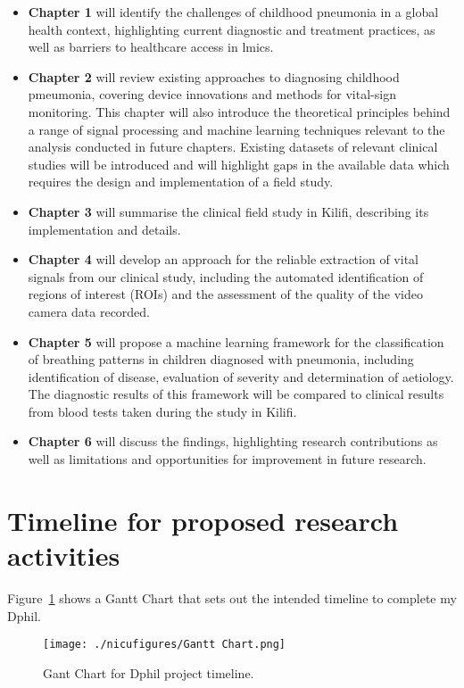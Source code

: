\begin{itemize}

\item\textbf{ Chapter 1} will identify the challenges of childhood pneumonia in a global health context, highlighting current diagnostic and treatment practices, as well as barriers to healthcare access in \gls{lmic}s. 

\item\textbf{ Chapter 2} will review existing approaches to diagnosing childhood pmeumonia, covering device innovations and methods for vital-sign monitoring. This chapter will also introduce the theoretical principles behind a range of signal processing and machine learning techniques relevant to the analysis conducted in future chapters. Existing datasets of relevant clinical studies will be introduced and will highlight gaps in the available data which requires the design and implementation of a field study.

\item \textbf{Chapter 3} will summarise the clinical field study in Kilifi, describing its implementation and details.

\item \textbf{Chapter 4} will develop an approach for the reliable extraction of vital signals from our clinical study, including the automated identification of regions of interest (ROIs) and the assessment of the quality of the video camera data recorded.

\item \textbf{Chapter 5} will propose a machine learning framework for the classification of breathing patterns in children diagnosed with pneumonia, including identification of disease, evaluation of severity and determination of aetiology. The diagnostic results of this framework will be compared to clinical results from blood tests taken during the study in Kilifi.
 
\item \textbf{Chapter 6} will discuss the findings, highlighting research contributions as well as limitations and opportunities for improvement in future research.
\end{itemize}
\section{Timeline for proposed research activities}
Figure~\ref{gantchart} shows a Gantt Chart that sets out the intended timeline to complete my Dphil. 
\begin{center}
\begin{figure}[H]
    \centering
\texttt{[image: ./nicufigures/Gantt Chart.png]}
 \caption[Gantt Chart for Dphil project timeline.]{Gant Chart for Dphil project timeline.}
     \label{gantchart}
\end{figure}
\end{center}

